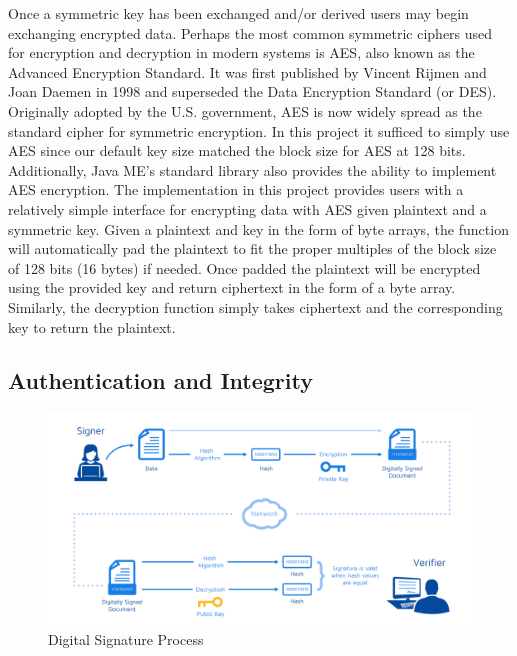 Once a symmetric key has been exchanged and/or derived users may begin exchanging encrypted data. Perhaps the most common symmetric ciphers used for encryption and decryption in modern systems is AES, also known as the Advanced Encryption Standard. It was first published by Vincent Rijmen and Joan Daemen in 1998 and superseded the Data Encryption Standard (or DES).  Originally adopted by the U.S. government, AES is now widely spread as the standard cipher for symmetric encryption. In this project it sufficed to simply use AES since our default key size matched the block size for AES at 128 bits. Additionally, Java ME's standard library also provides the ability to implement AES encryption. The implementation in this project provides users with a relatively simple interface for encrypting data with AES given plaintext and a symmetric key. Given a plaintext  and key in the form of byte arrays, the function will automatically pad the plaintext to fit the proper multiples of the block size of 128 bits (16 bytes) if needed. Once padded the plaintext will be encrypted using the provided key and return ciphertext in the form of a byte array. Similarly, the decryption function simply takes ciphertext and the corresponding key to return the plaintext. 

\subsection{Authentication and Integrity}

 \begin{figure}[t]
	\centering
	\includegraphics[width=14cm,height=0.7\textheight,keepaspectratio]{./figures/figure_4}
	\center\caption[font=footnote]{Digital Signature Process}
\end{figure}

